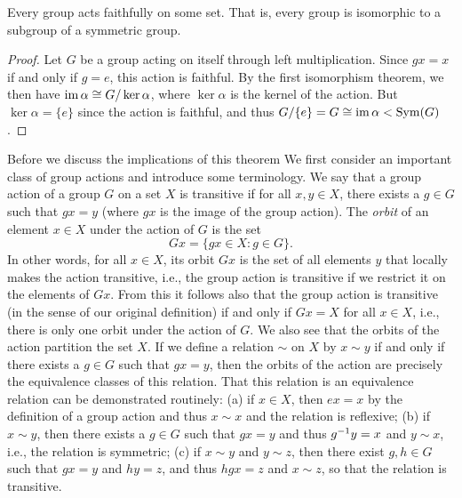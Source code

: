 \begin{theorem}
    Every group acts faithfully on some set. That is, every group is isomorphic
    to a subgroup of a symmetric group.
\end{theorem}

\begin{proof}
    Let \(G\) be a group acting on itself through left multiplication. Since
    \(gx = x\) if and only if \(g = e\), this action is faithful. By the first
    isomorphism theorem, we then have \(\operatorname{im} \alpha \cong G/\ker \alpha\), where
    \(\ker \alpha\) is the kernel of the action. But \(\ker \alpha = \{e\}\)
    since the action is faithful, and thus \(G/\{e\} = G \cong \operatorname{im} \alpha
    < \operatorname{Sym}(G)\).
\end{proof}

Before we discuss the implications of this theorem We first consider an
important class of group actions and introduce some terminology. We say that a
group action of a group \(G\) on a set \(X\) is transitive if for all \(x, y \in
X\), there exists a \(g \in G\) such that \(gx = y\) (where \(gx\) is the image
of the group action). The \emph{orbit} of an element \(x \in X\) under the
action of \(G\) is the set
\[
    Gx = \{gx \in X : g \in G\}.
\]
In other words, for all \(x \in X\), its orbit \(Gx\) is the set of all elements
\(y\) that locally makes the action transitive, i.e., the group action is
transitive if we restrict it on the elements of \(Gx\). From this it follows
also that the group action is transitive (in the sense of our original
definition) if and only if \(Gx = X\) for all \(x \in X\), i.e., there is only
one orbit under the action of \(G\). We also see that the orbits of the action
partition the set \(X\). If we define a relation \(\sim\) on \(X\) by \(x \sim
y\) if and only if there exists a \(g \in G\) such that \(gx = y\), then the
orbits of the action are precisely the equivalence classes of this relation.
That this relation is an equivalence relation can be demonstrated routinely: (a)
if \(x \in X\), then \(ex = x\) by the definition of a group action and thus \(x
\sim x\) and the relation is reflexive; (b) if \(x \sim y\), then there exists a
\(g \in G\) such that \(gx = y\) and thus \(g^{-1} y = x\) and \(y \sim x\),
i.e., the relation is symmetric; (c) if \(x \sim y\) and \(y \sim z\), then
there exist \(g, h \in G\) such that \(gx = y\) and \(hy = z\), and thus \(hgx =
z\) and \(x \sim z\), so that the relation is transitive.

